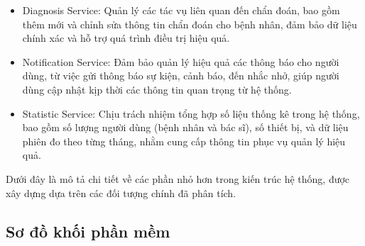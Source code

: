 \begin{adjustwidth}{1.5em}{}
\begin{itemize}
		\item Diagnosis Service: Quản lý các tác vụ liên quan đến chẩn đoán, bao gồm thêm mới và chỉnh sửa thông tin chẩn đoán cho bệnh nhân, đảm bảo dữ liệu chính xác và hỗ trợ quá trình điều trị hiệu quả.
		\item Notification Service: Đảm bảo quản lý hiệu quả các thông báo cho người dùng, từ việc gửi thông báo sự kiện, cảnh báo, đến nhắc nhở,
		      giúp người dùng cập nhật kịp thời các thông tin quan trọng từ hệ thống.
		\item Statistic Service: Chịu trách nhiệm tổng hợp số liệu thống kê trong hệ thống, bao gồm số lượng người dùng (bệnh nhân và bác sĩ),
		      số thiết bị, và dữ liệu phiên đo theo từng tháng, nhằm cung cấp thông tin phục vụ quản lý hiệu quả.
	\end{itemize}
\end{adjustwidth}

Dưới đây là mô tả chi tiết về các phần nhỏ hơn trong kiến trúc hệ thống, được xây dựng dựa trên các đối tượng chính đã phân tích.
\newpage
\subsection{Sơ đồ khối phần mềm}

